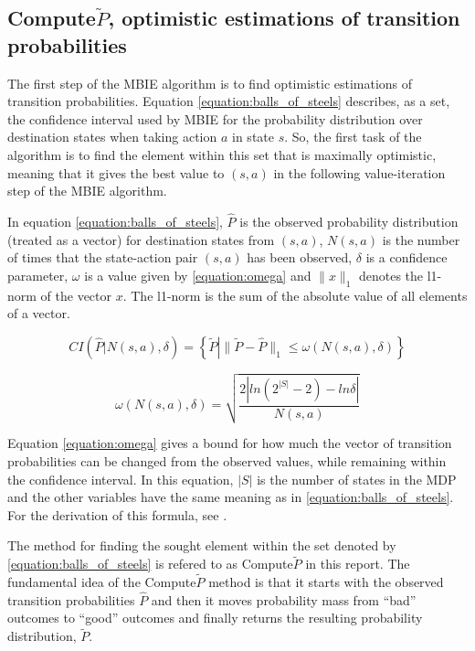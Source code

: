 
\subsection{Compute$\tilde{P}$, optimistic estimations of transition probabilities}
\label{sec:computep}

The first step of the MBIE algorithm is to find optimistic estimations of transition probabilities. Equation \eqref{equation:balls_of_steels} describes, as a set, the confidence interval used by MBIE for the probability distribution over destination states when taking action $a$ in state $s$. So, the first task of the algorithm is to find the element within this set that is maximally optimistic, meaning that it gives the best value to $(s,a)$ in the following value-iteration step of the MBIE algorithm. 

In equation \eqref{equation:balls_of_steels}, $\hat{P}$ is the observed probability distribution (treated as a vector) for destination states from $(s,a)$, $N(s,a)$ is the number of times that the state-action pair $(s,a)$ has been observed, $\delta$ is a confidence parameter,  $\omega$ is a value given by \eqref{equation:omega} and $\|x\|_1$ denotes the l1-norm of the vector $x$. The l1-norm is the sum of the absolute value of all elements of a vector. 

\begin{equation}
\label{equation:balls_of_steels}
CI\left(\hat{P} \left| N(s, a), \delta\right.\right)  = \left\{\tilde{P} \left| \|\tilde{P} - \hat{P}\|_1 \le \omega(N(s,a), \delta)\right.\right\}
\end{equation}

\begin{equation}
\label{equation:omega}
   \omega(N(s,a),\delta) = {\sqrt{\frac{2|ln(2^{|S|}-2) - ln  \delta |}{N(s,a)}}}
\end{equation}

Equation \eqref{equation:omega} gives a bound for how much the vector of transition probabilities can be changed from the observed values, while remaining within the confidence interval. In this equation, $|S|$ is the number of states in the MDP and the other variables have the same meaning as in \eqref{equation:balls_of_steels}. For the derivation of this formula, see  \textcite{Strehl20081309}.

The method for finding the sought element within the set denoted by \eqref{equation:balls_of_steels} 
is refered to as Compute$\tilde{P}$ in this report. 
The fundamental idea of the Compute$\tilde{P}$ method is that it starts with
the observed transition probabilities $\hat{P}$ and then it moves probability
mass from ``bad'' outcomes to ``good'' outcomes and finally returns the resulting probability distribution, $\tilde{P}$. 

